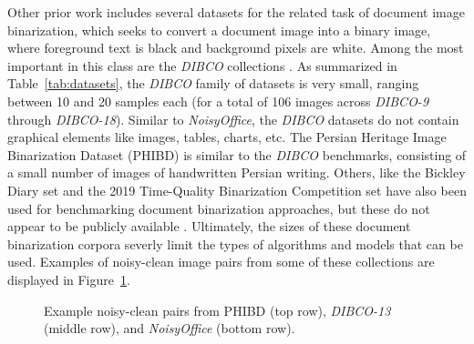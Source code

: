 \documentclass[runningheads]{llncs}
\begin{document}
Other prior work includes several datasets for the related task of document image binarization, which seeks to convert a document image into a binary image, where foreground text is black and background pixels are white.
Among the most important in this class are the \emph{DIBCO} collections \cite{dibco-09,dibco-10,dibco-11,dibco-12,dibco-13,dibco-14,dibco-16,dibco-17,dibco-18}.
As summarized in Table~\ref{tab:datasets}, the \emph{DIBCO} family of datasets is very small, ranging between 10 and 20 samples each (for a total of 106 images across \emph{DIBCO-9} through \emph{DIBCO-18}).
Similar to \emph{NoisyOffice}, the \emph{DIBCO} datasets do not contain graphical elements like images, tables, charts, etc.
The Persian Heritage Image Binarization Dataset (PHIBD) \cite{phibc-2012-nafchi,nafchi-2013-icdar} is similar to the \emph{DIBCO} benchmarks, consisting of a small number of images of handwritten Persian writing.
Others, like the Bickley Diary set \cite{bickley-diary} and the 2019 Time-Quality Binarization Competition set \cite{2019-time-quality-competition} have also been used for benchmarking document binarization approaches, but these do not appear to be publicly available \cite{tensmeyer-binarization-review-2020}.
Ultimately, the sizes of these document binarization corpora severly limit the types of algorithms and models that can be used.
Examples of noisy-clean image pairs from some of these collections are displayed in Figure~\ref{fig:other-dataset-examples}.

\begin{figure}
    \centering{}
    \caption{Example noisy-clean pairs from PHIBD (top row), \emph{DIBCO-13} (middle row), and \emph{NoisyOffice} (bottom row).}
    \label{fig:other-dataset-examples}
\end{figure}
\end{document}
